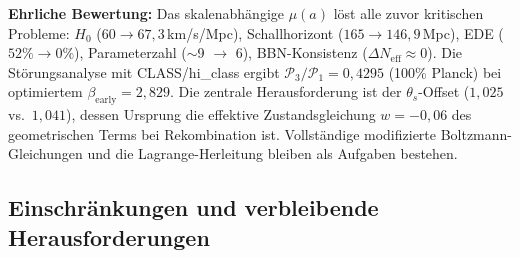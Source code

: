 \documentclass[aps,prd,twocolumn,superscriptaddress,nofootinbib]{revtex4-2}
\begin{document}
\textbf{Ehrliche Bewertung:} Das skalenabh\"angige $\mu(a)$ l\"ost alle zuvor kritischen Probleme: $H_0$ ($60 \to 67{,}3$\,km/s/Mpc), Schallhorizont ($165 \to 146{,}9$\,Mpc), EDE ($52\% \to 0\%$), Parameterzahl ($\sim$9 $\to$ 6), BBN-Konsistenz ($\Delta N_{\mathrm{eff}} \approx 0$). Die St\"orungsanalyse mit CLASS/hi\_class ergibt $\mathcal{P}_3/\mathcal{P}_1 = 0{,}4295$ (100\% Planck) bei optimiertem $\beta_{\mathrm{early}} = 2{,}829$. Die zentrale Herausforderung ist der $\theta_s$-Offset ($1{,}025$ vs.\ $1{,}041$), dessen Ursprung die effektive Zustandsgleichung $w = -0{,}06$ des geometrischen Terms bei Rekombination ist. Vollst\"andige modifizierte Boltzmann-Gleichungen und die Lagrange-Herleitung bleiben als Aufgaben bestehen.

\subsection{Einschr\"ankungen und verbleibende Herausforderungen}
\end{document}
